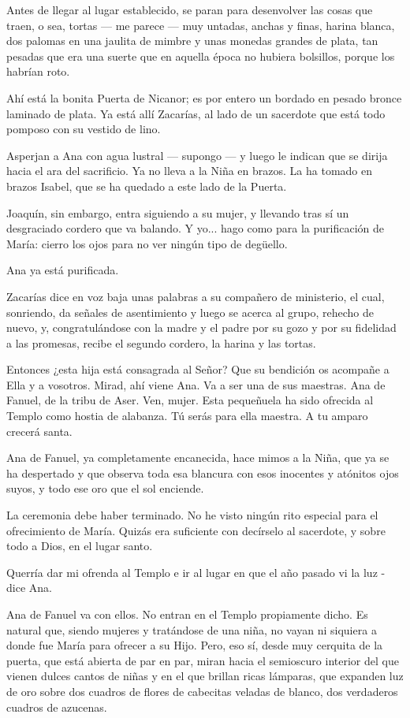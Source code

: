 \documentclass[12pt, twoside, openright]{book} %
\begin{document}
Antes de llegar al lugar establecido, se paran para desenvolver las cosas que traen, o sea, tortas — me parece — muy untadas, anchas y finas, harina blanca, dos palomas en una jaulita de mimbre y unas monedas grandes de plata, tan pesadas que era una suerte que en aquella época no hubiera bolsillos, porque los habrían roto. 

Ahí está la bonita Puerta de Nicanor; es por entero un bordado en pesado bronce laminado de plata. Ya está allí Zacarías, al lado de un sacerdote que está todo pomposo con su vestido de lino. 

Asperjan a Ana con agua lustral — supongo — y luego le indican que se dirija hacia el ara del sacrificio. Ya no lleva a la Niña en brazos. La ha tomado en brazos Isabel, que se ha quedado a este lado de la Puerta. 

Joaquín, sin embargo, entra siguiendo a su mujer, y llevando tras sí un desgraciado cordero que va balando. Y yo... hago como para la purificación de María: cierro los ojos para no ver ningún tipo de degüello. 

Ana ya está purificada. 

Zacarías dice en voz baja unas palabras a su compañero de ministerio, el cual, sonriendo, da señales de asentimiento y luego se acerca al grupo, rehecho de nuevo, y, congratulándose con la madre y el padre por su gozo y por su fidelidad a las promesas, recibe el segundo cordero, la harina y las tortas. 

Entonces ¿esta hija está consagrada al Señor? Que su bendición os acompañe a Ella y a vosotros. Mirad, ahí viene Ana. Va a ser una de sus maestras. Ana de Fanuel, de la tribu de Aser. Ven, mujer. Esta pequeñuela ha sido ofrecida al Templo como hostia de alabanza. Tú serás para ella maestra. A tu amparo crecerá santa. 

Ana de Fanuel, ya completamente encanecida, hace mimos a la Niña, que ya se ha despertado y que observa toda esa blancura con esos inocentes y atónitos ojos suyos, y todo ese oro que el sol enciende. 

La ceremonia debe haber terminado. No he visto ningún rito especial para el ofrecimiento de María. Quizás era suficiente con decírselo al sacerdote, y sobre todo a Dios, en el lugar santo. 

Querría dar mi ofrenda al Templo e ir al lugar en que el año pasado vi la luz - dice Ana. 

Ana de Fanuel va con ellos. No entran en el Templo propiamente dicho. Es natural que, siendo mujeres y tratándose de una niña, no vayan ni siquiera a donde fue María para ofrecer a su Hijo. Pero, eso sí, desde muy cerquita de la puerta, que está abierta de par en par, miran hacia el semioscuro interior del que vienen dulces cantos de niñas y en el que brillan ricas lámparas, que expanden luz de oro sobre dos cuadros de flores de cabecitas veladas de blanco, dos verdaderos cuadros de azucenas. 
\end{document}
